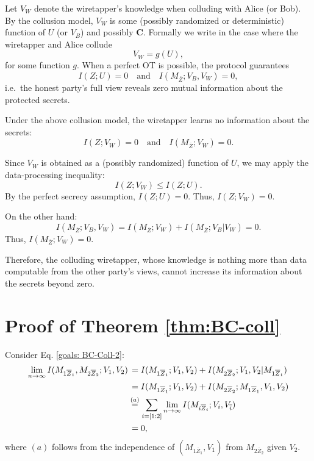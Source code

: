 \documentclass[runningheads]{llncs}
\newcommand{\parbreak}{ \vspace{0.3 em}}
\newcounter{protocol}
\begin{document}
\parbreak Let $V_W$ denote the wiretapper's knowledge when colluding with Alice (or Bob).  
By the collusion model, $V_W$ is some (possibly randomized or deterministic) function of $U$ (or $V_B$) and possibly $\mathbf{C}$.  
Formally we write in the case where the wiretapper and Alice collude
\[
  V_W = g(U),
\]
for some function $g$.
When a perfect OT is possible, the protocol guarantees
\begin{equation}
I(Z;U)=0
\quad \text{and} \quad
I(M_{\overline{Z}};V_B,V_W)=0,
\end{equation}
i.e.\ the honest party's full view reveals zero mutual information about the protected secrets.

Under the above collusion model, the wiretapper learns no information about the secrets:
\[
I(Z;V_W)=0 \quad\text{and}\quad I(M_{\overline{Z}};V_W)=0.
\]

Since $V_W$ is obtained as a (possibly randomized) function of $U$, we may apply the data-processing inequality:
\[
I(Z;V_W) \le I(Z;U).
\]
By the perfect secrecy assumption, $I(Z;U)=0$. 
Thus, $I(Z;V_W)=0$.

On the other hand:
\[
I(M_{\overline{Z}};V_B,V_W) = I(M_{\overline{Z}};V_W) + I(M_{\overline{Z}};V_B|V_W) = 0.
\]
Thus, $I(M_{\overline{Z} };V_W) = 0$.

Therefore, the colluding wiretapper, whose knowledge is nothing more than data computable from the other party's views, cannot increase its information about the secrets beyond zero. 

\section{Proof of Theorem \ref{thm:BC-coll}\label{app1:proof of thm:BC-coll}}

\parbreak Consider Eq. \eqref{goals: BC-Coll-2}:
\begin{align}
    \lim_{n\rightarrow\infty}I (  M_{1\overline{Z}_1},M_{2\overline{Z}_2};V_1,V_2) & \,= I (  M_{1\overline{Z}_1};V_1,V_2) + I (  M_{2\overline{Z}_2};V_1,V_2|M_{1\overline{Z}_1})\notag\\
    & \,= I (  M_{1\overline{Z}_1};V_1,V_2) + I (  M_{2\overline{Z}_2};M_{1\overline{Z}_1}, V_1,V_2)\notag\\
    & \overset{(a)}{=} \sum_{i=[1:2]}\lim_{n\rightarrow\infty}I (  M_{i\overline{Z}_i};V_i,V_{\overline{i}})\\
    & \,= 0,\notag
\end{align}
where $(a)$ follows from the independence of $(M_{1\overline{Z}_1},V_1)$ from $M_{2\overline{Z}_2}$ given $V_2$.
\end{document}
